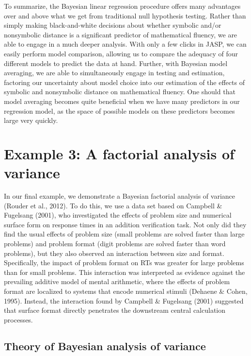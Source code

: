 \documentclass[english,,doc,floatsintext]{apa6}
\begin{document}
To summarize, the Bayesian linear regression procedure offers many advantages over and above what we get from traditional null hypothesis testing. Rather than simply making black-and-white decisions about whether symbolic and/or nonsymbolic distance is a significant predictor of mathematical fluency, we are able to engage in a much deeper analysis. With only a few clicks in JASP, we can easily perform model comparison, allowing us to compare the adequacy of four different models to predict the data at hand. Further, with Bayesian model averaging, we are able to simultaneously engage in testing and estimation, factoring our uncertainty about model choice into our estimation of the effects of symbolic and nonsymbolic distance on mathematical fluency. One should that model averaging becomes quite beneficial when we have many predictors in our regression model, as the space of possible models on these predictors becomes large very quickly.

\hypertarget{example-3-a-factorial-analysis-of-variance}{%
\section{Example 3: A factorial analysis of variance}\label{example-3-a-factorial-analysis-of-variance}}

In our final example, we demonstrate a Bayesian factorial analysis of variance (Rouder et al., 2012). To do this, we use a data set based on Campbell \& Fugelsang (2001), who investigated the effects of problem size and numerical surface form on response times in an addition verification task. Not only did they find the usual effects of problem size (small problems are solved faster than large problems) and problem format (digit problems are solved faster than word problems), but they also observed an interaction between size and format. Specifically, the impact of problem format on RTs was greater for large problems than for small problems. This interaction was interpreted as evidence against the prevailing additive model of mental arithmetic, where the effects of problem format are localized to systems that encode numerical stimuli (Dehaene \& Cohen, 1995). Instead, the interaction found by Campbell \& Fugelsang (2001) suggested that surface format directly penetrates the downstream central calculation processes.

\hypertarget{theory-of-bayesian-analysis-of-variance}{%
\subsection{Theory of Bayesian analysis of variance}\label{theory-of-bayesian-analysis-of-variance}}
\end{document}
